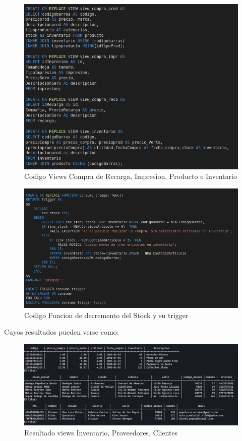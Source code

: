 \documentclass[letter,12pt]{article}
\begin{document}
\begin{center}
\begin{figure}[H]
\includegraphics[scale=.8]{viewProdRecargaImpresionInventario.png}
\caption{Codigo Views Compra de Recarga, Impresion, Producto e Inventario}
\end{figure}
\newpage
\begin{figure}[H]
\includegraphics[scale=.7]{function_Trigger.png}
\caption{Codigo Funcion de decremento del Stock y su trigger}
\end{figure}
\end{center}
Cuyos resultados pueden verse como:
\begin{figure}[H]
\includegraphics[scale=.44]{viewInvenProvClienteR.png}
\caption{Resultado views Inventario, Proveedores, Clientes}
\end{figure}
\end{document}
